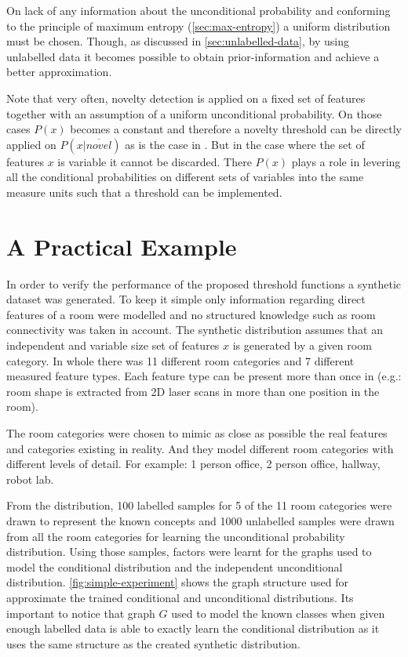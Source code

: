 On lack of any information about the unconditional probability and conforming to
the principle of maximum entropy (\autoref{sec:max-entropy}) a uniform
distribution must be chosen.
Though, as discussed in \autoref{sec:unlabelled-data}, by using unlabelled data
it becomes possible to obtain prior-information and achieve a better
approximation.


Note that very often, novelty detection is applied on a fixed set of features
together with an assumption of a uniform unconditional probability.
On those cases $P(x)$ becomes a constant and therefore a novelty threshold
can be directly applied on $P(x|\overline{novel})$ as is the case in \cite{bishop1994novelty}.
But in the case where the set of features $x$ is variable it cannot be
discarded. There $P(x)$ plays a role in levering all the conditional
probabilities on different sets of variables into the same measure units
such that a threshold can be implemented.



\section{A Practical Example}
\label{sec:unlabelled-data}
In order to verify the performance of the proposed threshold functions a synthetic dataset
was generated. To keep it simple only information regarding direct features of
a room were modelled and no structured knowledge such as room connectivity was taken
in account.
The synthetic distribution assumes that an independent and variable size set of features
$x$ is generated by a given room category.
In whole there was 11 different room categories and 7 different measured feature
types. Each feature type can be present more than once in (e.g.: room shape is
extracted from 2D laser scans in more than one position in the room).

The room categories were chosen to mimic as close as possible the real features and
categories existing in reality. And they model different room categories with
different levels of detail. For example: 1 person office, 2 person office, hallway,
robot lab.

From the distribution, 100 labelled samples for 5 of the 11 room categories were
drawn to represent the known concepts and 1000 unlabelled samples were drawn from
all the room categories for learning the unconditional probability distribution.
Using those samples, factors were learnt for the graphs used to model the
conditional distribution and the independent unconditional distribution.
\autoref{fig:simple-experiment} shows the graph structure used for approximate the
trained conditional and unconditional distributions.
Its important to notice that graph $G$ used to model the known classes when given
enough labelled data is able to exactly learn the conditional distribution as it
uses the same structure as the created synthetic distribution.

